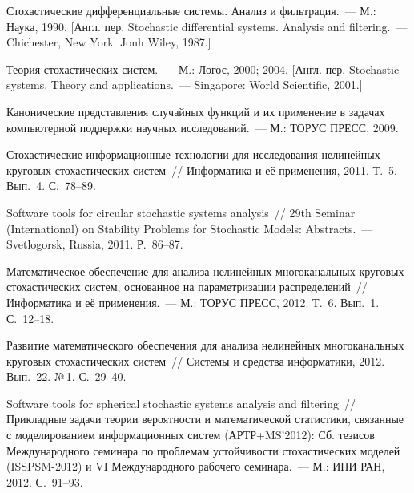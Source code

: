 \begin{multicols}{2}

{\small\frenchspacing
{%
\begin{thebibliography}{99}


Стохастические дифференциальные системы. Анализ и фильтрация.~--- М.: Наука,  1990. 
[Англ. пер. Stochastic differential systems. Analysis and filtering.~--- Chichester, New York: Jonh Wiley, 1987.]

Теория стохастических систем.~--- М.: Логос, 2000; 2004. [Англ. пер. Stochastic systems. Theory and  applications.~--- Singapore: World
Scientific, 2001.]

Канонические представления случайных функций и их применение в задачах компьютерной поддержки 
научных исследований.~--- М.: ТОРУС ПРЕСС, 2009.

 Стохастические информационные технологии для исследования нелинейных круговых 
стохастических сис\-тем~// Информатика и её применения, 2011. Т.~5. Вып.~4. С.~78--89.

Software tools for circular stochastic systems analysis~// 29th  Seminar (International)
on Stability Problems for Stochastic Models: Abstracts.~--- Svetlogorsk, Russia, 2011. Р.~86--87.

 Математическое обеспечение для анализа нелинейных многоканальных 
круговых стохастических сис\-тем, основанное на параметризации распределений~// Информатика и её применения.~--- 
М.: ТОРУС ПРЕСС, 2012. Т.~6. Вып.~1. С.~12--18.

Развитие математического обеспечения для анализа нелинейных многоканальных 
круговых стохастических сис\-тем~// Системы и средства информатики, 2012. Вып.~22. №\,1. С.~29--40.

  
Software tools for spherical stochastic systems analysis and filtering~//  
Прикладные задачи теории вероятности и математической статистики, связанные 
с моделированием информационных сис\-тем (АРТР+MS'2012): Сб. тезисов Международного семинара по проблемам 
устойчивости стохастических моделей (ISSPSM-2012) и  VI Международного рабочего семинара.~--- М.: ИПИ РАН, 2012. С.~91--93.


\end{thebibliography}}}
\end{multicols}
